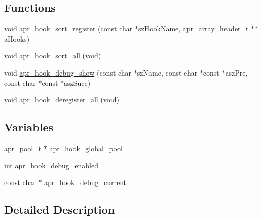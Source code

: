\subsection*{Functions}
\begin{DoxyCompactItemize}
\item 
void \hyperlink{group___a_p_r___util___hook_ga04843fe00dc3c08c23130fef3ba1260c}{apr\-\_\-hook\-\_\-sort\-\_\-register} (const char $\ast$sz\-Hook\-Name, apr\-\_\-array\-\_\-header\-\_\-t $\ast$$\ast$a\-Hooks)
\item 
void \hyperlink{group___a_p_r___util___hook_ga1e0b6cf91dac5417c1b9cbd1b46b8991}{apr\-\_\-hook\-\_\-sort\-\_\-all} (void)
\item 
void \hyperlink{group___a_p_r___util___hook_ga1de31557683f53c2a07f73990962c585}{apr\-\_\-hook\-\_\-debug\-\_\-show} (const char $\ast$sz\-Name, const char $\ast$const $\ast$asz\-Pre, const char $\ast$const $\ast$asz\-Succ)
\item 
void \hyperlink{group___a_p_r___util___hook_ga5d20451da75574c8433feb1bd5b2ce10}{apr\-\_\-hook\-\_\-deregister\-\_\-all} (void)
\end{DoxyCompactItemize}
\subsection*{Variables}
\begin{DoxyCompactItemize}
\item 
apr\-\_\-pool\-\_\-t $\ast$ \hyperlink{group___a_p_r___util___hook_ga8911bb699a5f03ad3c36d579ca0eca23}{apr\-\_\-hook\-\_\-global\-\_\-pool}
\item 
int \hyperlink{group___a_p_r___util___hook_ga59309caeb9b47d921727530494f264be}{apr\-\_\-hook\-\_\-debug\-\_\-enabled}
\item 
const char $\ast$ \hyperlink{group___a_p_r___util___hook_ga37be3c217439ceddbda16054b020a658}{apr\-\_\-hook\-\_\-debug\-\_\-current}
\end{DoxyCompactItemize}


\subsection{Detailed Description}


